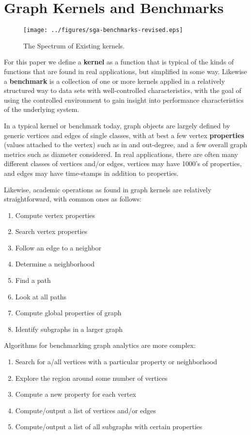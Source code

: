 \section{Graph Kernels and Benchmarks}\label{sec:sga-graph}

\begin{figure*}\begin{centering}
\texttt{[image: ../figures/sga-benchmarks-revised.eps]}
\caption{The Spectrum of Existing kernels.}
\label{fig:sga-benchmarks}
\end{centering}\end{figure*}

For this paper we define a \textbf{kernel} as a function that is typical of the kinds of functions that are found in real applications, but simplified in some way. Likewise a \textbf{benchmark} is a collection of one or more kernels applied in a relatively structured way to data sets with well-controlled characteristics, with the goal of using the controlled environment to gain insight into performance characteristics of the underlying system.

In a typical kernel or benchmark today, graph objects are largely defined by  generic vertices and edges of single classes, with at best a few vertex \textbf{properties} (values attached to the vertex) such as in and out-degree, and a few overall graph metrics such as diameter considered. In real applications, there are often many different classes of vertices and/or edges, vertices may have 1000’s of properties, and edges may have time-stamps in addition to properties.

Likewise, academic operations as found in graph kernels are relatively straightforward, with common ones as follows:
\begin{enumerate}
\item Compute vertex properties
\item Search vertex properties
\item Follow an edge to a neighbor
\item Determine a neighborhood
\item Find a path
\item Look at all paths
\item Compute global properties of graph
\item Identify subgraphs in a larger graph
\end{enumerate}

Algorithms for benchmarking graph analytics are more complex:
\begin{enumerate}
\item Search for a/all vertices with a particular property or neighborhood
\item Explore the region around some number of vertices
\item Compute a new property for each vertex
\item Compute/output a list of vertices and/or edges
\item Compute/output a list of all subgraphs with certain properties
\end{enumerate}

